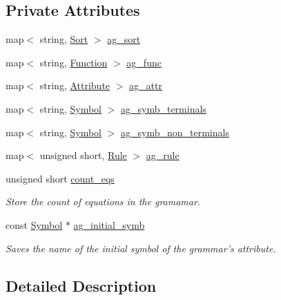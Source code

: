 \subsection*{Private Attributes}
\begin{CompactItemize}
\item 
map$<$ string, \hyperlink{classgenevalmag_1_1Sort}{Sort} $>$ \hyperlink{classgenevalmag_1_1Attr__grammar_799dddeffb394e06770b8143b46cbc87}{ag\_\-sort}
\item 
map$<$ string, \hyperlink{classgenevalmag_1_1Function}{Function} $>$ \hyperlink{classgenevalmag_1_1Attr__grammar_3ebc66b5f02a2c6806a6002dd09fc34f}{ag\_\-func}
\item 
map$<$ string, \hyperlink{classgenevalmag_1_1Attribute}{Attribute} $>$ \hyperlink{classgenevalmag_1_1Attr__grammar_f8eda41983da416b71568b230495cac3}{ag\_\-attr}
\item 
map$<$ string, \hyperlink{classgenevalmag_1_1Symbol}{Symbol} $>$ \hyperlink{classgenevalmag_1_1Attr__grammar_ae56008f83f809143d7f157a7281831d}{ag\_\-symb\_\-terminals}
\item 
map$<$ string, \hyperlink{classgenevalmag_1_1Symbol}{Symbol} $>$ \hyperlink{classgenevalmag_1_1Attr__grammar_82631f05839109d0569a1554a35fa906}{ag\_\-symb\_\-non\_\-terminals}
\item 
map$<$ unsigned short, \hyperlink{classgenevalmag_1_1Rule}{Rule} $>$ \hyperlink{classgenevalmag_1_1Attr__grammar_962f40d15bf80b0e10b27126bd149a93}{ag\_\-rule}
\item 
unsigned short \hyperlink{classgenevalmag_1_1Attr__grammar_127f4869156cd76ee3381b19d8c7cc9a}{count\_\-eqs}
\begin{CompactList}\small\item\em Store the count of equations in the gramamar. \item\end{CompactList}\item 
const \hyperlink{classgenevalmag_1_1Symbol}{Symbol} $\ast$ \hyperlink{classgenevalmag_1_1Attr__grammar_bdcc6aa17756d47b0e6e131b26050b42}{ag\_\-initial\_\-symb}
\begin{CompactList}\small\item\em Saves the name of the initial symbol of the grammar's attribute. \item\end{CompactList}\end{CompactItemize}


\subsection{Detailed Description}


